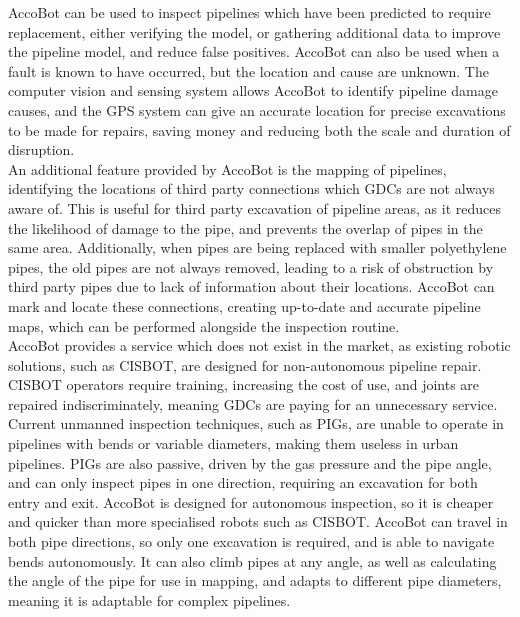 \documentclass[11pt]{article}		%
\begin{document}
		AccoBot can be used to inspect pipelines which have been predicted to require replacement, either verifying the model, or gathering additional data to improve the pipeline model, and reduce false positives.
		AccoBot can also be used when a fault is known to have occurred, but the location and cause are unknown.
		The computer vision and sensing system allows AccoBot to identify pipeline damage causes, and the GPS system can give an accurate location for precise excavations to be made for repairs, saving money and reducing both the scale and duration of disruption.
		\\
        \hspace*{3ex}An additional feature provided by AccoBot is the mapping of pipelines, identifying the locations of third party connections which GDCs are not always aware of.
		This is useful for third party excavation of pipeline areas, as it reduces the likelihood of damage to the pipe, and prevents the overlap of pipes in the same area.
		Additionally, when pipes are being replaced with smaller polyethylene pipes, the old pipes are not always removed, leading to a risk of obstruction by third party pipes due to lack of information about their locations.
		AccoBot can mark and locate these connections, creating up-to-date and accurate pipeline maps, which can be performed alongside the inspection routine.
		\\
        \hspace*{3ex}AccoBot provides a service which does not exist in the market, as existing robotic solutions, such as CISBOT, are designed for non-autonomous pipeline repair.
		CISBOT operators require training, increasing the cost of use, and joints are repaired indiscriminately, meaning GDCs are paying for an unnecessary service.
		Current unmanned inspection techniques, such as PIGs, are unable to operate in pipelines with bends or variable diameters, making them useless in urban pipelines.
		PIGs are also passive, driven by the gas pressure and the pipe angle, and can only inspect pipes in one direction, requiring an excavation for both entry and exit.
		AccoBot is designed for autonomous inspection, so it is cheaper and quicker than more specialised robots such as CISBOT.
		AccoBot can travel in both pipe directions, so only one excavation is required, and is able to navigate bends autonomously.
		It can also climb pipes at any angle, as well as calculating the angle of the pipe for use in mapping, and adapts to different pipe diameters, meaning it is adaptable for complex pipelines.
				
\end{document}

